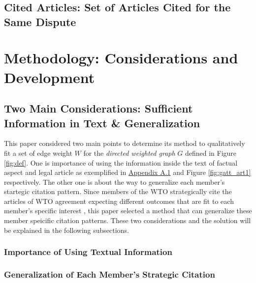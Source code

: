 \documentclass[12pt,letterpaper]{article}
\begin{document}
\subsection{Cited Articles: Set of Articles Cited for the Same Dispute}


\section{Methodology: Considerations and Development}


\subsection{Two Main Considerations: Sufficient Information in Text \& Generalization} \label{justification-nn}
This paper considered two main points to
determine its method to qualitatively fit a set of edge weight $W$ for the \textit{directed weighted graph} $G$ defined in Figure \ref{fig:def}.
One is importance of using the information inside the text of factual aspect and legal article as exemplified in \hyperref[sub:factual-aspect-example]{Appendix A.1} and Figure {\ref{fig:gatt_art1}} respectively. The other one is about the way to generalize each member's startegic citation pattern. Since members of the WTO strategically cite
the articles of WTO agreement expecting different outcomes that are fit to each member's specific interest \citep{who_gets, pelc, latent}, this paper
selected a method that can generalize these member speicific citation patterns. These two considerations and the solution will be explained in the following subsections.


\subsubsection{Importance of Using Textual Information}


\subsubsection{Generalization of Each Member's Strategic Citation}
\end{document}
